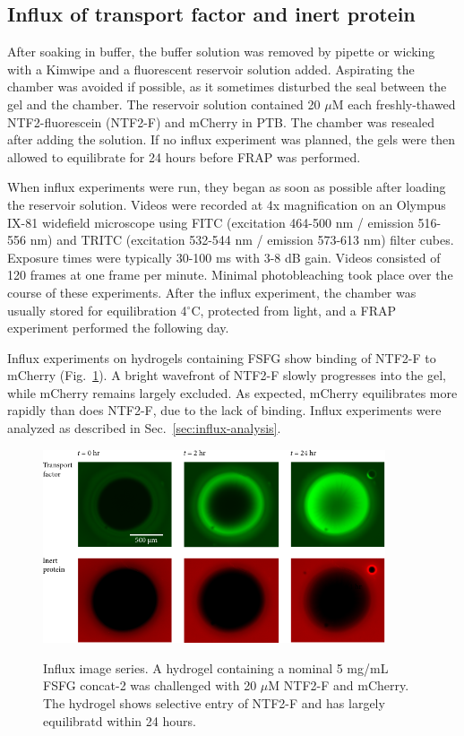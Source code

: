 \subsection{Influx of transport factor and inert protein}
After soaking in buffer, the buffer solution was removed by pipette or wicking with a Kimwipe and a fluorescent reservoir solution added.  Aspirating the chamber was avoided if possible, as it sometimes disturbed the seal between the gel and the chamber.  The reservoir solution contained 20 $\mu$M each freshly-thawed NTF2-fluorescein (NTF2-F) and mCherry in PTB.  The chamber was resealed after adding the solution.  If no influx experiment was planned, the gels were then allowed to  equilibrate for 24 hours before FRAP was performed.

When influx experiments were run, they began as soon as possible after loading the reservoir solution.  Videos were recorded at 4x magnification on an Olympus IX-81 widefield microscope using FITC (excitation 464-500 nm / emission 516-556 nm) and TRITC (excitation 532-544 nm / emission 573-613 nm) filter cubes.  Exposure times were typically 30-100 ms with 3-8 dB gain.  Videos consisted of 120 frames at one frame per minute. Minimal photobleaching took place over the course of these experiments.  After the influx experiment, the chamber was usually stored for equilibration 4$^\circ$C, protected from light, and a FRAP experiment performed the following day.

Influx experiments on hydrogels containing FSFG show binding of NTF2-F to mCherry (Fig.~\ref{fig:influx-images}).  A bright wavefront  of NTF2-F slowly progresses into the gel, while mCherry remains largely excluded.  As expected, mCherry equilibrates more rapidly than does NTF2-F, due to the lack of binding.  Influx experiments were analyzed as described in Sec.~\ref{sec:influx-analysis}.

\begin{figure}
\caption[Influx experiments images.]{Influx image series.  A hydrogel containing a nominal 5 mg/mL FSFG concat-2 was challenged with 20 $\mu$M NTF2-F and mCherry.  The hydrogel shows selective entry of NTF2-F and has largely equilibratd within 24 hours.}
\centering
\includegraphics[width=0.9\textwidth]{figs/ch04/influx-images-clean.pdf}
\label{fig:influx-images}
\end{figure} 

